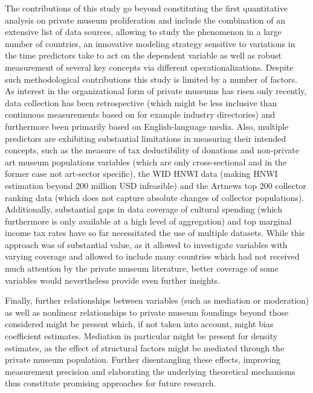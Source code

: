 \documentclass[11pt]{article}
\begin{document}
The contributions of this study go beyond constituting the first quantitative analysis on private museum proliferation and include the combination of an extensive list of data sources, allowing to study the phenomenon in a large number of countries, an innovative modeling strategy sensitive to variations in the time predictors take to act on the dependent variable as well as robust measurement of several key concepts via different operationalizations.
Despite such methodological contributions this study is limited by a number of factors. 
As interest in the organizational form of private museums has risen only recently, data collection has been retrospective (which might be less inclusive than continuous measurements based on for example industry directories) and furthermore been primarily based on English-language media.
Also, multiple predictors are exhibiting substantial limitations in measuring their intended concepts, such as the measure of tax deductibility of donations and non-private art museum populations variables (which are only cross-sectional and in the former case not art-sector specific), the WID HNWI data (making HNWI estimation beyond 200 million USD infeasible) and the Artnews top 200 collector ranking data (which does not capture absolute changes of collector populations).
Additionally, substantial gaps in data coverage of cultural spending (which furthermore is only available at a high level of aggregation) and top marginal income tax rates have so far necessitated the use of multiple datasets.
While this approach was of substantial value, as it allowed to investigate variables with varying coverage and  allowed to include many countries which had not received much attention by the private museum literature, better coverage of some variables would nevertheless provide even further insights.


Finally, further relationships between variables (such as mediation or moderation) as well as nonlinear relationships to private museum foundings beyond those considered might be present which, if not taken into account, might bias coefficient estimates.
Mediation in particular might be present for density estimates, as the effect of structural factors might be mediated through the private museum population.
Further disentangling these effects, improving measurement precision and elaborating the underlying theoretical mechanisms thus constitute promising approaches for future research. 

\begin{sloppypar}
\printbibliography
\end{sloppypar}
\end{document}
